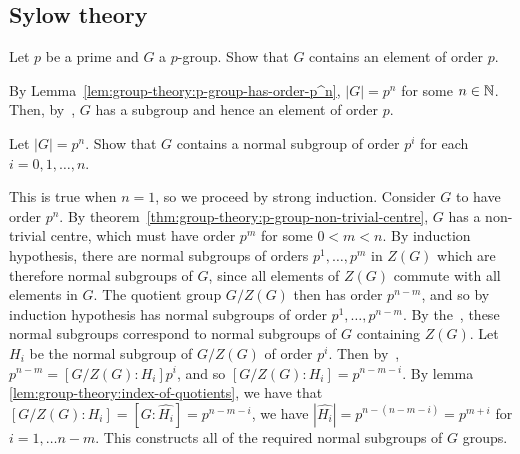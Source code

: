 \subsection{Sylow theory}
\begin{questions}
  \begin{question}
    Let \(p\) be a prime and \(G\) a \(p\)-group. Show that \(G\) contains an element of order \(p\).
  \end{question}

  \begin{solution}
    By Lemma~\ref{lem:group-theory:p-group-has-order-p^n}, \(|G| = p^{n}\) for some \(n \in \mathbb{N}\). Then, by~, \(G\) has a subgroup and hence an element of order \(p\).
  \end{solution}

  \begin{question}
    Let \(|G| = p^{n}\). Show that \(G\) contains a normal subgroup of order \(p^{i}\) for each \(i = 0, 1, \ldots, n\).
  \end{question}

  \begin{solution}
    This is true when \(n = 1\), so we proceed by strong induction. Consider \(G\) to have order \(p^{n}\). By theorem~\ref{thm:group-theory:p-group-non-trivial-centre}, \(G\) has a non-trivial centre, which must have order \(p^{m}\) for some \(0 < m < n\). By induction hypothesis, there are normal subgroups of orders \(p^{1}, \ldots, p^{m}\) in \(Z(G)\) which are therefore normal subgroups of \(G\), since all elements of \(Z(G)\) commute with all elements in \(G\). The quotient group \(G / Z(G)\) then has order \(p^{n - m}\), and so by induction hypothesis has normal subgroups of order \(p^{1}, \ldots, p^{n-m}\). By the~, these normal subgroups correspond to normal subgroups of \(G\) containing \(Z(G)\). Let \(H_{i}\) be the normal subgroup of \(G/Z(G)\) of order \(p^{i}\). Then by~, \(p^{n-m} = [G/Z(G) : H_{i}] p^{i}\), and so \([G/Z(G) : H_{i}] = p^{n-m-i}\). By lemma \ref{lem:group-theory:index-of-quotients}, we have that \([G/Z(G) : H_{i}] = [G : \hat{H_{i}}] = p^{n-m-i}\), we have \(|\hat{H_{i}}| = p^{n - (n - m - i)} = p^{m + i}\) for \(i = 1, \ldots n-m\). This constructs all of the required normal subgroups of \(G\) groups.
  \end{solution}
\end{questions}




